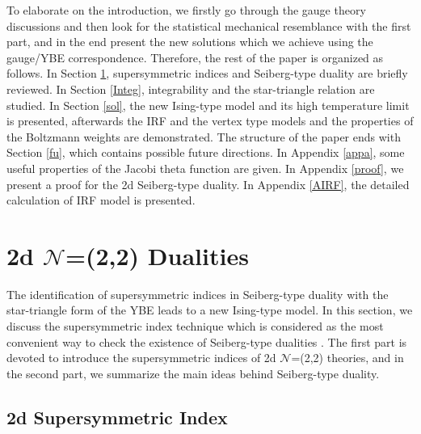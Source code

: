 \documentclass[a4paper,11pt]{article}%
\numberwithin{equation}{section}
\begin{document}
To elaborate on the  introduction, we firstly go through the gauge theory discussions and then look for the statistical mechanical resemblance with the first part, and in the end present the new solutions which we achieve using the gauge/YBE correspondence. Therefore, the rest of the paper is organized as follows. In Section \ref{2d sup}, supersymmetric indices and Seiberg-type duality are briefly reviewed. In Section \ref{Integ}, integrability and the star-triangle relation are studied. In Section \ref{sol}, the new Ising-type model and its high temperature limit is presented, afterwards the IRF and the vertex type models and the properties of the Boltzmann weights are demonstrated.  The structure of the paper ends with Section \ref{fu}, which contains possible future directions. In Appendix \ref{appa}, some useful properties of the Jacobi theta function are given. In Appendix \ref{proof}, we present a proof for the 2d Seiberg-type duality. In Appendix \ref{AIRF}, the detailed calculation of IRF model is presented.




\section{2d $\mathcal{N}$=(2,2) Dualities}\label{2d sup}

The identification of supersymmetric indices in Seiberg-type duality with the star-triangle form of the YBE leads to a new Ising-type model. In this section, we discuss the supersymmetric index technique which is considered as the most convenient way to check the existence of Seiberg-type dualities \cite{Spiridonov:2008zr}. The first part is devoted to introduce the supersymmetric indices of 2d $\mathcal{N}$=(2,2) theories, and in the second part, we summarize the main ideas behind Seiberg-type duality.
\subsection{ 2d Supersymmetric Index} 
\end{document}
